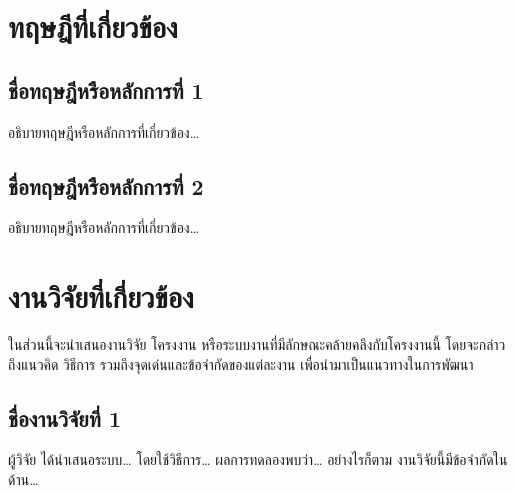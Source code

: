 

\section{ทฤษฎีที่เกี่ยวข้อง}

\subsection{ชื่อทฤษฎีหรือหลักการที่ 1}

อธิบายทฤษฎีหรือหลักการที่เกี่ยวข้อง\ldots{}~\cite{fielding2000}

\subsection{ชื่อทฤษฎีหรือหลักการที่ 2}

อธิบายทฤษฎีหรือหลักการที่เกี่ยวข้อง\ldots{}~\cite{cocalc2024}

\section{งานวิจัยที่เกี่ยวข้อง}

ในส่วนนี้จะนำเสนองานวิจัย โครงงาน หรือระบบงานที่มีลักษณะคล้ายคลึงกับโครงงานนี้ โดยจะกล่าวถึงแนวคิด วิธีการ รวมถึงจุดเด่นและข้อจำกัดของแต่ละงาน เพื่อนำมาเป็นแนวทางในการพัฒนา

\subsection{ชื่องานวิจัยที่ 1}

ผู้วิจัย \cite{example2024} ได้นำเสนอระบบ\ldots{} โดยใช้วิธีการ\ldots{} ผลการทดลองพบว่า\ldots{} อย่างไรก็ตาม งานวิจัยนี้มีข้อจำกัดในด้าน\ldots{}

